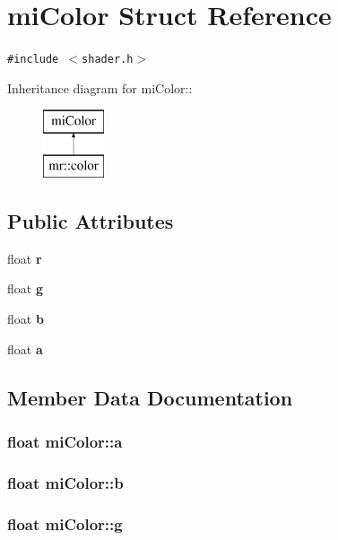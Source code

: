 \section{mi\-Color Struct Reference}
\label{structmiColor}
{\tt \#include $<$shader.h$>$}

Inheritance diagram for mi\-Color::\begin{figure}[H]
\begin{center}
\leavevmode
\includegraphics[height=2cm]{structmiColor}
\end{center}
\end{figure}
\subsection*{Public Attributes}
\begin{CompactItemize}
\item 
float {\bf r}
\item 
float {\bf g}
\item 
float {\bf b}
\item 
float {\bf a}
\end{CompactItemize}


\subsection{Member Data Documentation}
\subsubsection{\setlength{\rightskip}{0pt plus 5cm}float {\bf mi\-Color::a}}\label{structmiColor_o3}


\subsubsection{\setlength{\rightskip}{0pt plus 5cm}float {\bf mi\-Color::b}}\label{structmiColor_o2}


\subsubsection{\setlength{\rightskip}{0pt plus 5cm}float {\bf mi\-Color::g}}\label{structmiColor_o1}


